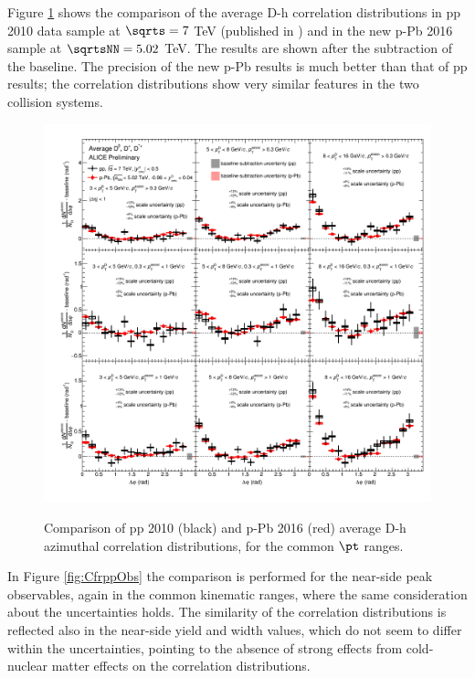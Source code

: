 Figure \ref{fig:CfrppCorrel} shows the comparison of the average D-h correlation distributions in pp 2010 data sample at $\rm{\sqrts = 7}$ TeV (published in \cite{ALICEDhcorr}) and in the new p-Pb 2016 sample at $\rm{\sqrtsNN = 5.02}$ TeV. The results are shown after the subtraction of the baseline. The precision of the new p-Pb results is much better than that of pp results; the correlation distributions show very similar features in the two collision systems. 

\begin{figure}[!htbp]
\centering
{\includegraphics[width=\linewidth]{figures/CfrPPandModels/plotComparison_WeightedAverage_pp_pPb_UniqueCanvas_Style1.png}}
\caption{Comparison of pp 2010 (black) and p-Pb 2016 (red) average D-h azimuthal correlation distributions, for the common $\pt$ ranges.}
\label{fig:CfrppCorrel}
\end{figure}

In Figure \ref{fig:CfrppObs} the comparison is performed for the near-side peak observables, again in the common kinematic ranges, where the same consideration about the uncertainties holds. The similarity of the correlation distributions is reflected also in the near-side yield and width values, which do not seem to differ within the uncertainties, pointing to the absence of strong effects from cold-nuclear matter effects on the correlation distributions.


